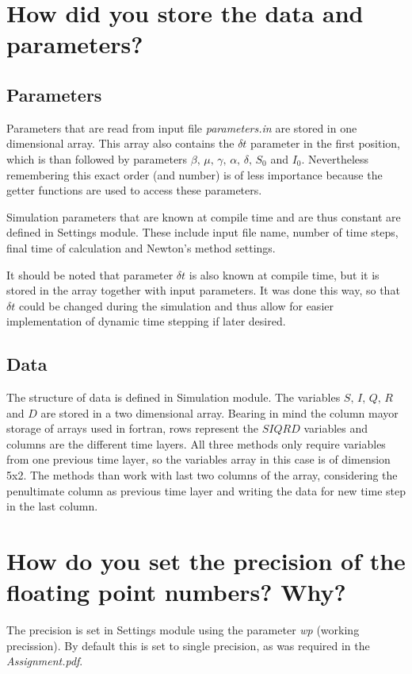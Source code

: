 \documentclass[a4paper]{article}
\begin{document}
\section{How did you store the data and parameters?} \label{sec:data}
\subsection{Parameters}
Parameters that are read from input file \textit{parameters.in} are stored in one dimensional array. This array also contains the $ \delta t $ parameter in the first position, which is than followed by parameters $ \beta, \, \mu, \, \gamma, \, \alpha, \, \delta, \, S_0 $ and $ I_0 $. Nevertheless remembering this exact order (and number) is of less importance because the getter functions are used to access these parameters.

Simulation parameters that are known at compile time and are thus constant are defined in Settings module. These include input file name, number of time steps, final time of calculation and Newton's method settings.

It should be noted that parameter $ \delta t $ is also known at compile time, but it is stored in the array together with input parameters. It was done this way, so that $ \delta t $ could be changed during the simulation and thus allow for easier implementation of dynamic time stepping if later desired.

\subsection{Data}
The structure of data is defined in Simulation module. The variables $ S,\,I,\,Q,\,R$ and $D $ are stored in a two dimensional array. Bearing in mind the column mayor storage of arrays used in fortran, rows represent the $ SIQRD $ variables and columns are the different time layers. All three methods only require variables from one previous time layer, so the variables array in this case is of dimension 5x2. The methods than work with last two columns of the array, considering the penultimate column as previous time layer and writing the data for new time step in the last column.

\section{How do you set the precision of the floating point numbers? Why?}
The precision is set in Settings module using the parameter \textit{wp} (working precission). By default this is set to single precision, as was required in the \textit{Assignment.pdf}.
\end{document}
